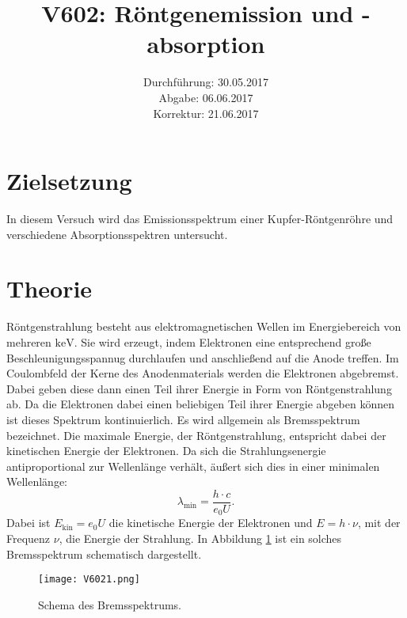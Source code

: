 \documentclass[
  bibliography=totoc,     %
  captions=tableheading,  %
  titlepage=firstiscover, %
]{scrartcl}
\title{V602: Röntgenemission und -absorption}
\author{
  Simon Schulte
  \texorpdfstring{
    \\
    \href{mailto:simon.schulte@udo.edu}{simon.schulte@udo.edu}
  }{}
  \texorpdfstring{\and}{, }
  Tim Sedlaczek
  \texorpdfstring{
    \\
    \href{mailto:tim.sedlaczek@udo.edu}{tim.sedlaczek@udo.edu}
  }{}
}
\date{Durchführung: 30.05.2017\\
      Abgabe: 06.06.2017\\
      Korrektur: 21.06.2017}
\begin{document}
\maketitle
\thispagestyle{empty}
\tableofcontents
\newpage
\setcounter{page}{1}
\section{Zielsetzung}
\label{sec:zielsetzung}
In diesem Versuch wird das Emissionsspektrum einer Kupfer-Röntgenröhre
und verschiedene Absorptionsspektren untersucht.
\section{Theorie}
\label{sec:theorie}
Röntgenstrahlung besteht aus elektromagnetischen Wellen im Energiebereich von
mehreren $\si{\kilo\electronvolt}$. Sie wird erzeugt, indem Elektronen eine
entsprechend große Beschleunigungsspannug durchlaufen und anschließend auf die
Anode treffen. Im Coulombfeld der Kerne des Anodenmaterials werden die Elektronen
abgebremst. Dabei geben diese dann einen Teil ihrer Energie in Form von
Röntgenstrahlung ab. Da die Elektronen dabei einen beliebigen Teil ihrer Energie
abgeben können ist dieses Spektrum kontinuierlich. Es wird allgemein als
Bremsspektrum bezeichnet. Die maximale Energie, der Röntgenstrahlung, entspricht
dabei der kinetischen Energie der Elektronen. Da sich die Strahlungsenergie
antiproportional zur Wellenlänge verhält, äußert sich dies in einer minimalen
Wellenlänge:
\begin{equation}
  \lambda_\mathup{min} = \frac{h \cdot c}{e_0 U}.
  \label{eqn:minlam}
\end{equation}
Dabei ist $E_\mathup{kin} = e_0 U$ die kinetische Energie der Elektronen und
$E = h \cdot \nu$, mit der Frequenz $\nu$, die Energie der Strahlung.
In Abbildung \ref{fig:V6021} ist ein solches Bremsspektrum schematisch
dargestellt.
\begin{figure}[htb]
  \centering
  \texttt{[image: V6021.png]}
  \caption{Schema des Bremsspektrums. \cite{anleitung}}
  \label{fig:V6021}
\end{figure}
\end{document}
